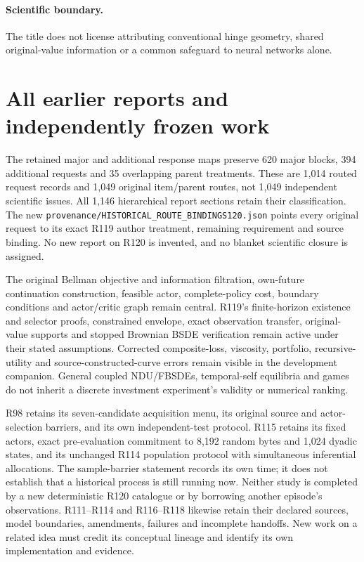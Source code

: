 \paragraph{Scientific boundary.}
The title does not license attributing conventional hinge geometry, shared original-value information or a common safeguard to neural networks alone.

\section{All earlier reports and independently frozen work}
The retained major and additional response maps preserve 620 major blocks,
394 additional requests and 35 overlapping parent treatments. These are
1,014 routed request records and 1,049 original item/parent routes, not
1,049 independent scientific issues. All 1,146 hierarchical report sections
retain their classification. The new
\nolinkurl{provenance/HISTORICAL_ROUTE_BINDINGS120.json}
points every original request to its exact R119 author treatment, remaining
requirement and source binding. No new report on R120 is invented, and no
blanket scientific closure is assigned.

The original Bellman objective and information filtration, own-future
continuation construction, feasible actor, complete-policy cost, boundary
conditions and actor/critic graph remain central. R119's finite-horizon
existence and selector proofs, constrained envelope, exact observation
transfer, original-value supports and stopped Brownian BSDE verification
remain active under their stated assumptions. Corrected composite-loss,
viscosity, portfolio, recursive-utility and source-constructed-curve errors
remain visible in the development companion. General coupled NDU/FBSDEs,
temporal-self equilibria and games do not inherit a discrete investment
experiment's validity or numerical ranking.

R98 retains its seven-candidate acquisition menu, its original source and
actor-selection barriers, and its own independent-test protocol. R115
retains its fixed actors, exact pre-evaluation commitment to 8,192 random
bytes and 1,024 dyadic states, and its unchanged R114 population protocol
with simultaneous inferential allocations. The sample-barrier statement
records its own time; it does not establish that a historical process is
still running now. Neither study is completed by a new deterministic R120
catalogue or by borrowing another episode's observations. R111--R114 and
R116--R118 likewise retain their declared sources, model boundaries,
amendments, failures and incomplete handoffs. New work on a related idea
must credit its conceptual lineage and identify its own implementation
and evidence.

